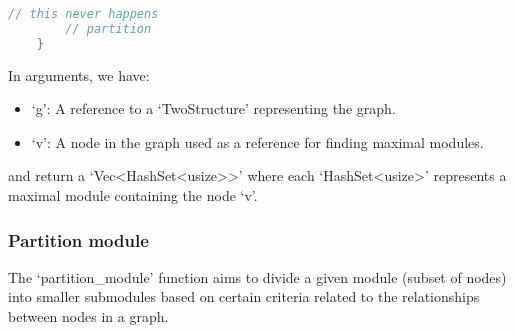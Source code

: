 \begin{lstlisting}[language=Rust, style=rust, caption={Defining the maximal modules}, label={lst:rust-define-maximal-modules}, firstnumber=1]
        // this never happens
        // partition
    }
\end{lstlisting}

In arguments, we have:
\begin{itemize}
    \item `g': A reference to a `TwoStructure' representing the graph.
    \item `v': A node in the graph used as a reference for finding maximal modules.
\end{itemize}

and return a `Vec\textless HashSet\textless usize\textgreater\textgreater' where each `HashSet\textless usize\textgreater' represents a maximal module containing the node `v'.

\subsubsection{Partition module}

The `partition\_module' function aims to divide a given module (subset of nodes) into smaller submodules based on certain criteria related to the relationships between nodes in a graph.

